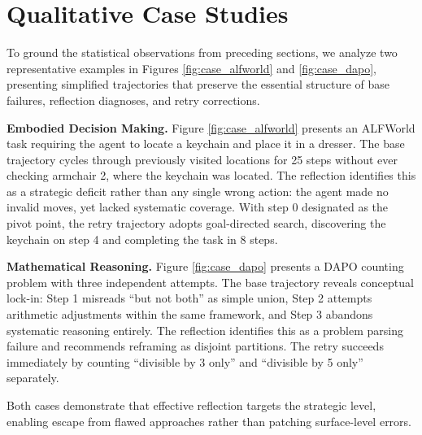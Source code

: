 \documentclass{article} %
\theoremstyle{definition}
\theoremstyle{remark}
\begin{document}
\section{Qualitative Case Studies}
\label{sec:case_studies}

To ground the statistical observations from preceding sections, we analyze two representative examples in Figures \ref{fig:case_alfworld} and \ref{fig:case_dapo}, presenting simplified trajectories that preserve the essential structure of base failures, reflection diagnoses, and retry corrections.

\textbf{Embodied Decision Making.} Figure \ref{fig:case_alfworld} presents an ALFWorld task requiring the agent to locate a keychain and place it in a dresser. The base trajectory cycles through previously visited locations for 25 steps without ever checking armchair 2, where the keychain was located. The reflection identifies this as a strategic deficit rather than any single wrong action: the agent made no invalid moves, yet lacked systematic coverage. With step 0 designated as the pivot point, the retry trajectory adopts goal-directed search, discovering the keychain on step 4 and completing the task in 8 steps.

\textbf{Mathematical Reasoning.} Figure \ref{fig:case_dapo} presents a DAPO counting problem with three independent attempts. The base trajectory reveals conceptual lock-in: Step 1 misreads ``but not both'' as simple union, Step 2 attempts arithmetic adjustments within the same framework, and Step 3 abandons systematic reasoning entirely. The reflection identifies this as a problem parsing failure and recommends reframing as disjoint partitions. The retry succeeds immediately by counting ``divisible by 3 only'' and ``divisible by 5 only'' separately.

Both cases demonstrate that effective reflection targets the strategic level, enabling escape from flawed approaches rather than patching surface-level errors.




\end{document}
